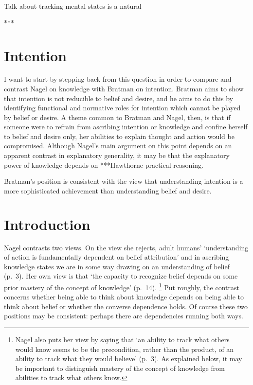 \documentclass[11pt,a4paper]{extarticle}
\begin{document}
Talk about tracking mental states is a natural 

***

\section{Intention}
I want to start by stepping back from this question in order to compare and contrast Nagel on knowledge with Bratman on intention.
Bratman aims to show that intention is not reducible to belief and desire,
and he aims to do this by identifying functional and normative roles for intention which cannot be played by belief or desire.
A theme  common to Bratman and Nagel, then, is that if someone were to refrain from ascribing intention or knowledge and confine herself to belief and desire only, her abilities to explain thought and action would be compromised.
Although Nagel's main argument on this point depends on an apparent contrast in explanatory generality, it may be that the explanatory power of knowledge depends on ***Hawthorne practical reasoning.



Bratman's position is consistent with the view that understanding intention is a more sophisticated achievement than understanding belief and desire.




\section{Introduction}
Nagel contrasts two views.
On the view she rejects, adult humans' `understanding of action is fundamentally dependent on belief attribution' and in ascribing knowledge states we are in some way drawing on an understanding of belief (p.\ 3).
Her own view is that `the capacity to recognize belief depends on some prior mastery of the concept of knowledge' (p.\ 14).%
\footnote{
Nagel also puts her view by saying that `an ability to track what others would know seems to be the precondition, rather than the product, of an ability to track what they would believe' (p.\ 3).
As explained below, it may be important to distinguish mastery of the concept of knowledge from abilities to track what others know.
}
Put roughly, the contrast concerns whether being able to think about knowledge depends on being able to think about belief or whether the converse dependence holds.
Of course these two positions may be consistent: perhaps there are dependencies running both ways.  
\end{document}
